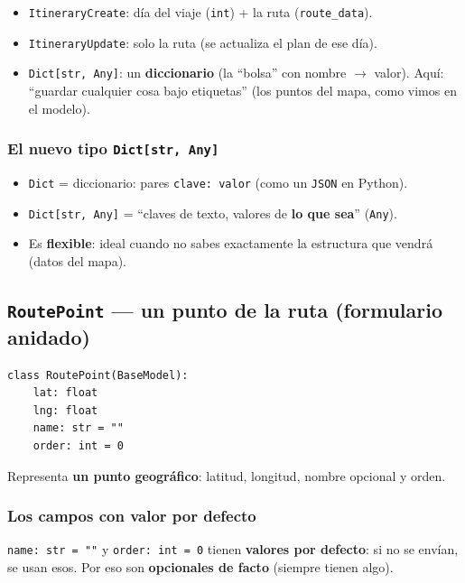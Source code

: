 \documentclass[11pt,a4paper]{article}
\begin{document}
\begin{itemize}
    \item \texttt{ItineraryCreate}: día del viaje (\texttt{int}) + la ruta (\texttt{route\_data}).
    \item \texttt{ItineraryUpdate}: solo la ruta (se actualiza el plan de ese día).
    \item \texttt{Dict[str, Any]}: un \textbf{diccionario} (la ``bolsa'' con nombre $\rightarrow$ valor).
    Aquí: ``guardar cualquier cosa bajo etiquetas'' (los puntos del mapa, como vimos en el modelo).
\end{itemize}

\subsubsection{El nuevo tipo \texttt{Dict[str, Any]}}

\begin{itemize}
    \item \texttt{Dict} = diccionario: pares \texttt{clave: valor} (como un \texttt{JSON} en Python).
    \item \texttt{Dict[str, Any]} = ``claves de texto, valores de \textbf{lo que sea}'' (\texttt{Any}).
    \item Es \textbf{flexible}: ideal cuando no sabes exactamente la estructura que vendrá (datos del mapa).
\end{itemize}

\subsection{\texttt{RoutePoint} --- un punto de la ruta (formulario anidado)}

\begin{lstlisting}
class RoutePoint(BaseModel):
    lat: float
    lng: float
    name: str = ""
    order: int = 0
\end{lstlisting}

Representa \textbf{un punto geográfico}: latitud, longitud, nombre opcional y orden.

\subsubsection{Los campos con valor por defecto}

\texttt{name: str = ""} y \texttt{order: int = 0} tienen \textbf{valores por defecto}: si no se
envían, se usan esos. Por eso son \textbf{opcionales de facto} (siempre tienen algo).
\end{document}
